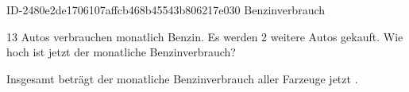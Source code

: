 \begin{exercise}
      {ID-2480e2de1706107affcb468b45543b806217e030}
      {Benzinverbrauch}
  \ifproblem\problem\par
    \num{13} Autos verbrauchen monatlich  Benzin. Es werden \num{2} weitere Autos
    gekauft. Wie hoch ist jetzt der monatliche Benzinverbrauch?
  \fi
  \ifoutcome\outcome\par
    Insgesamt beträgt der monatliche Benzinverbrauch aller Farzeuge jetzt .
  \fi
\end{exercise}

